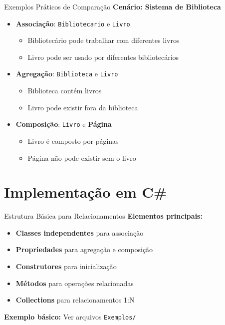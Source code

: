 \documentclass[aspectratio=169]{beamer}
\begin{document}
\begin{frame}{Exemplos Práticos de Comparação}
\textbf{Cenário: Sistema de Biblioteca}

\begin{itemize}
\item \textbf{Associação}: \texttt{Bibliotecario} e \texttt{Livro}
\begin{itemize}
\item Bibliotecário pode trabalhar com diferentes livros
\item Livro pode ser usado por diferentes bibliotecários
\end{itemize}

\item \textbf{Agregação}: \texttt{Biblioteca} e \texttt{Livro}
\begin{itemize}
\item Biblioteca contém livros
\item Livro pode existir fora da biblioteca
\end{itemize}

\item \textbf{Composição}: \texttt{Livro} e \textbf{Página}
\begin{itemize}
\item Livro é composto por páginas
\item Página não pode existir sem o livro
\end{itemize}
\end{itemize}
\end{frame}

\section{Implementação em C\#}

\begin{frame}{Estrutura Básica para Relacionamentos}
\textbf{Elementos principais:}
\begin{itemize}
\item \textbf{Classes independentes} para associação
\item \textbf{Propriedades} para agregação e composição
\item \textbf{Construtores} para inicialização
\item \textbf{Métodos} para operações relacionadas
\item \textbf{Collections} para relacionamentos 1:N
\end{itemize}

\vspace{0.3cm}
\textbf{Exemplo básico:} Ver arquivos \texttt{Exemplos/}
\end{frame}
\end{document}
